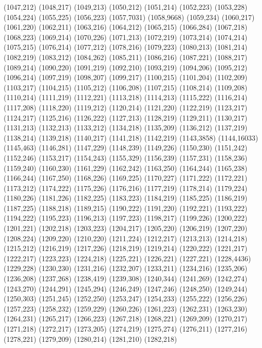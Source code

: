 (1047,212)
(1048,217)
(1049,213)
(1050,212)
(1051,214)
(1052,223)
(1053,228)
(1054,224)
(1055,225)
(1056,223)
(1057,7031)
(1058,9668)
(1059,234)
(1060,217)
(1061,220)
(1062,211)
(1063,216)
(1064,212)
(1065,215)
(1066,284)
(1067,218)
(1068,223)
(1069,214)
(1070,226)
(1071,213)
(1072,219)
(1073,214)
(1074,214)
(1075,215)
(1076,214)
(1077,212)
(1078,216)
(1079,223)
(1080,213)
(1081,214)
(1082,219)
(1083,212)
(1084,262)
(1085,211)
(1086,216)
(1087,221)
(1088,217)
(1089,214)
(1090,220)
(1091,219)
(1092,210)
(1093,219)
(1094,206)
(1095,212)
(1096,214)
(1097,219)
(1098,207)
(1099,217)
(1100,215)
(1101,204)
(1102,209)
(1103,217)
(1104,215)
(1105,212)
(1106,208)
(1107,215)
(1108,214)
(1109,208)
(1110,214)
(1111,219)
(1112,221)
(1113,218)
(1114,213)
(1115,222)
(1116,214)
(1117,208)
(1118,220)
(1119,212)
(1120,214)
(1121,220)
(1122,219)
(1123,217)
(1124,217)
(1125,216)
(1126,222)
(1127,213)
(1128,219)
(1129,211)
(1130,217)
(1131,213)
(1132,213)
(1133,212)
(1134,218)
(1135,209)
(1136,212)
(1137,219)
(1138,214)
(1139,218)
(1140,217)
(1141,218)
(1142,219)
(1143,3858)
(1144,16033)
(1145,463)
(1146,281)
(1147,229)
(1148,239)
(1149,226)
(1150,230)
(1151,242)
(1152,246)
(1153,217)
(1154,243)
(1155,329)
(1156,239)
(1157,231)
(1158,236)
(1159,240)
(1160,230)
(1161,229)
(1162,242)
(1163,250)
(1164,244)
(1165,238)
(1166,244)
(1167,250)
(1168,226)
(1169,225)
(1170,227)
(1171,222)
(1172,221)
(1173,212)
(1174,222)
(1175,226)
(1176,216)
(1177,219)
(1178,214)
(1179,224)
(1180,226)
(1181,226)
(1182,225)
(1183,223)
(1184,219)
(1185,225)
(1186,219)
(1187,225)
(1188,218)
(1189,215)
(1190,222)
(1191,220)
(1192,221)
(1193,222)
(1194,222)
(1195,223)
(1196,213)
(1197,223)
(1198,217)
(1199,226)
(1200,222)
(1201,221)
(1202,218)
(1203,223)
(1204,217)
(1205,220)
(1206,219)
(1207,220)
(1208,224)
(1209,220)
(1210,220)
(1211,224)
(1212,217)
(1213,213)
(1214,218)
(1215,212)
(1216,219)
(1217,226)
(1218,219)
(1219,214)
(1220,222)
(1221,217)
(1222,217)
(1223,223)
(1224,218)
(1225,221)
(1226,221)
(1227,221)
(1228,4436)
(1229,228)
(1230,230)
(1231,216)
(1232,207)
(1233,211)
(1234,216)
(1235,206)
(1236,208)
(1237,268)
(1238,419)
(1239,308)
(1240,344)
(1241,269)
(1242,274)
(1243,270)
(1244,291)
(1245,294)
(1246,249)
(1247,246)
(1248,250)
(1249,244)
(1250,303)
(1251,245)
(1252,250)
(1253,247)
(1254,233)
(1255,222)
(1256,226)
(1257,223)
(1258,232)
(1259,229)
(1260,226)
(1261,223)
(1262,231)
(1263,230)
(1264,231)
(1265,217)
(1266,223)
(1267,218)
(1268,221)
(1269,209)
(1270,217)
(1271,218)
(1272,217)
(1273,205)
(1274,219)
(1275,274)
(1276,211)
(1277,216)
(1278,221)
(1279,209)
(1280,214)
(1281,210)
(1282,218)
